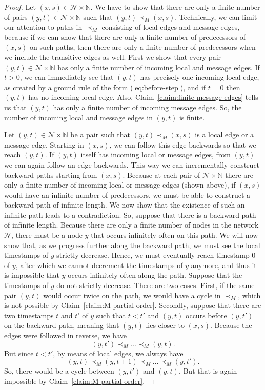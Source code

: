 \documentclass{tlp}
\newcommand{\Nat}{\mathbb{N}}  \newcommand{\len}[1]{|#1|} \newcommand{\rom}[1]{\text{\emph{(#1)}}} \newcommand{\romI}{\rom i}
\newcommand{\nw}{\mathcal{N}}
\newcommand{\nwnat}{\nw\times\Nat}
\newcommand{\cauM}{\prec_{M}}
\begin{document}
\begin{proof}

Let $(x,s)\in\nwnat$. We have to show that there are only a finite
number of pairs $(y,t)\in\nwnat$ such that $(y,t)\cauM(x,s)$. Technically,
we can limit our attention to paths in $\cauM$ consisting of local
edges and message edges, because if we can show that there are only
a finite number of predecessors of $(x,s)$ on such paths, then there
are only a finite number of predecessors when we include the transitive
edges as well. First we show that every pair $(y,t)\in\nwnat$ has
only a finite number of incoming local and message edges. If $t>0$,
we can immediately see that $(y,t)$ has precisely one incoming local
edge, as created by a ground rule of the form (\ref{eq:before-step}),
and if $t=0$ then $(y,t)$ has no incoming local edge. Also, Claim~\ref{claim:finite-message-edges}
tells us that $(y,t)$ has only a finite number of incoming message
edges. So, the number of incoming local and message edges in $(y,t)$
is finite.



Let $(y,t)\in\nwnat$ be a pair such that $(y,t)\cauM(x,s)$ is a
local edge or a message edge. Starting in $(x,s)$, we can follow
this edge backwards so that we reach $(y,t)$. If $(y,t)$ itself
has incoming local or message edges, from $(y,t)$ we can again follow
an edge backwards. This way we can incrementally construct backward
paths starting from $(x,s)$. Because at each pair of $\nwnat$ there
are only a finite number of incoming local or message edges (shown
above), if $(x,s)$ would have an infinite number of predecessors,
we must be able to construct a backward path of infinite length. 
We now show that the existence of such an infinite path leads to a
contradiction.  So, suppose that there is a backward path of infinite
length. Because there are only a finite number of nodes in the network
$\nw$, there must be a node $y$ that occurs infinitely often on
this path. We will now show that, as we progress further along the
backward path, we must see the local timestamps of $y$ strictly decrease.
Hence, we must eventually reach timestamp $0$ of $y$, after which
we cannot decrement the timestamps of $y$ anymore, and thus it is
impossible that $y$ occurs infinitely often along the path. Suppose
that the timestamps of $y$ do not strictly decrease. There are two
cases. First, if the same pair $(y,t)$ would occur twice on the path,
we would have a cycle in $\cauM$, which is not possible by Claim~\ref{claim:M-partial-order}.
Secondly, suppose that there are two timestamps $t$ and $t'$ of
$y$ such that $t<t'$ and $(y,t)$ occurs before $(y,t')$ on the
backward path, meaning that $(y,t)$ lies closer to $(x,s)$. Because
the edges were followed in reverse, we have 
\[
(y,t')\cauM\ldots\cauM(y,t).
\]
But since $t<t'$, by means of local edges, we always have 
\[
(y,t)\cauM(y,t+1)\cauM\ldots\cauM(y,t').
\]
So, there would be a cycle between $(y,t')$ and $(y,t)$. But that is again impossible
by Claim~\ref{claim:M-partial-order}. \end{proof}
\end{document}
